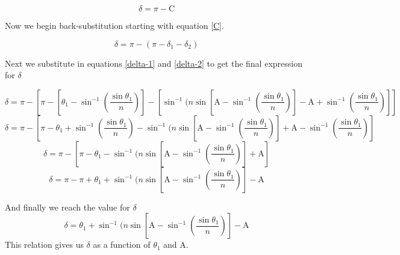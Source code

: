 \begin{equation} \label{delta}
	\delta = \pi - \mathrm{C}
\end{equation}

Now we begin back-substitution starting with equation \ref{C}.

$$
	\delta = \pi - (\pi - \delta_1 - \delta_2)
$$

Next we substitute in equations \ref{delta-1} and \ref{delta-2} to get the final expression for $\delta$

$$
	\delta = \pi - \left[\pi - \left[\theta_1 - \sin^{-1}\left(\frac{\sin\theta_1}{n}\right)\right] - 
	\left[ \sin^{-1}(n\sin\left[ \mathrm{A} - \sin^{-1}\left(\frac{\sin\theta_1}{n}\right) \right]
  	- \mathrm{A} + \sin^{-1}\left(\frac{\sin\theta_1}{n}\right) \right]\right]
$$
$$
	\delta = \pi - \left[\pi - \theta_1 + \sin^{-1}\left(\frac{\sin\theta_1}{n}\right) - 
	\sin^{-1}(n\sin\left[ \mathrm{A} - \sin^{-1}\left(\frac{\sin\theta_1}{n}\right) \right]
  	+ \mathrm{A} - \sin^{-1}\left(\frac{\sin\theta_1}{n}\right) \right]
$$
$$
	\delta = \pi - \left[\pi - \theta_1 - 
	\sin^{-1}(n\sin\left[ \mathrm{A} - \sin^{-1}\left(\frac{\sin\theta_1}{n}\right) \right]
  	+ \mathrm{A} \right]
$$
$$
	\delta = \pi - \pi + \theta_1 + 
	\sin^{-1}(n\sin\left[ \mathrm{A} - \sin^{-1}\left(\frac{\sin\theta_1}{n}\right) \right]
  	- \mathrm{A}
$$

And finally we reach the value for $\delta$
\begin{equation*} \label{delta-simplified}
	\delta = \theta_1 + 
	\sin^{-1}(n\sin\left[ \mathrm{A} - \sin^{-1}\left(\frac{\sin\theta_1}{n}\right) \right]
  	- \mathrm{A}	
\end{equation*}
This relation gives us $\delta$ as a function of $\theta_1$ and A. 


